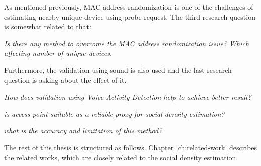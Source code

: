 As mentioned previously, MAC address randomization is one of the challenges of estimating nearby unique device using probe-request. The third research question is somewhat related to that:
\begin{displayquote}\textit{
Is there any method to overcome the MAC address randomization issue? Which affecting number of unique devices.}
\end{displayquote}

Furthermore, the validation using sound is also used and the last research question is asking about the effect of it.
\begin{displayquote}\textit{
How does validation using Voice Activity Detection help to achieve better result?}
\end{displayquote}

\begin{displayquote}
	\textit{is access point suitable as a reliable proxy for social density estimation?}
\end{displayquote}

\begin{displayquote}
	\textit{what is the accuracy and limitation of this method?}
\end{displayquote}

The rest of this thesis is structured as follows. Chapter \ref{ch:related-work} describes the related works, which are closely related to the social density estimation.






